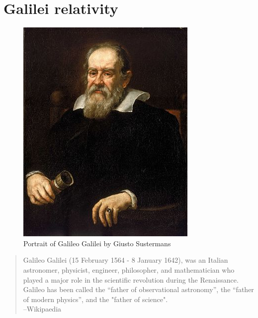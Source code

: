 \chapter{Galilei relativity}




\thispagestyle{empty}
\newpage

\thispagestyle{empty}
\begin{figure}[H]
\centering
\includegraphics[scale=3]{src/images/lbk-graphics/portraits/galileo-wiki.jpg}
\caption*{Portrait of Galileo Galilei by Giusto Sustermans}
\end{figure}

\begin{small}
\begin{quote}
Galileo Galilei (15 February 1564 - 8 January 1642),
was an Italian astronomer, physicist, engineer,
philosopher, and mathematician who played a major role
in the scientific revolution during the Renaissance.
Galileo has been called the ``father of observational
astronomy'', the ``father of modern physics'', and the 
"father of science". \\\dm \hfill --Wikipaedia
\end{quote}
\end{small}

